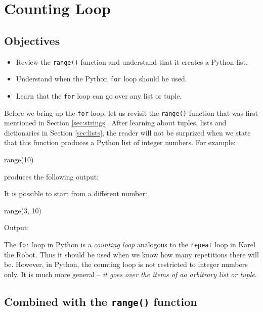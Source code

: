 
\section{Counting Loop} \label{sec:forloop}

\subsection{Objectives}

\begin{itemize}
\item Review the {\tt range()} function and understand that it creates a Python list.
\item Understand when the Python {\tt for} loop should be used.
\item Learn that the {\tt for} loop can go over any list or tuple.
\end{itemize}
Before we bring up the {\tt for} loop, let us revisit the {\tt range()}
function that was first mentioned in Section \ref{sec:strings}. After 
learning about tuples, lists and dictionaries in Section \ref{sec:lists}, the 
reader will not be surprized when we state that this function produces 
a Python list of integer numbers. For example:

\begin{bluecode}
range(10)
\end{bluecode}
produces the following output:

\begin{greencode}
[0, 1, 2, 3, 4, 5, 6, 7, 8, 9]
\end{greencode}
It is possible to start from a different number:

\begin{bluecode}
range(3, 10)
\end{bluecode}
Output:

\begin{greencode}
[3, 4, 5, 6, 7, 8, 9]
\end{greencode}
The {\tt for} loop in Python is a {\em counting loop} analogous to the {\tt repeat}
loop in Karel the Robot. Thus it should be used when we know how many repetitions there 
will be. However, in Python, the counting loop is not restricted to integer numbers 
only. It is much more general -- {\em it goes over the items of aa arbitrary list or tuple}. 

\subsection{Combined with the {\tt range()} function}

